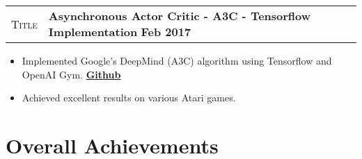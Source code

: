 \documentclass[9pt, a4paper, oneside, final]{scrartcl} %
\newcommand{\gray}{\rowcolor[gray]{.90}} %
\begin{document}
\begin{center}
\begin{tabularx}{1.0\linewidth}{>{\raggedleft\scshape}p{2.2cm}X}
\gray Title & \textbf{Asynchronous Actor Critic - A3C - Tensorflow Implementation} \hfill \textbf{Feb 2017}\\
\end{tabularx}
\end{center}

\begin{itemize}\itemsep1.2pt \parskip0pt 
\item Implemented Google's DeepMind (A3C) algorithm using Tensorflow and OpenAI Gym. \textbf{\href{https://github.com/sthalles/asynchronous-advantage-actor-critic}{Github}}
\item Achieved excellent results on various Atari games. 
\end{itemize}

\section{Overall Achievements}
\end{document}
